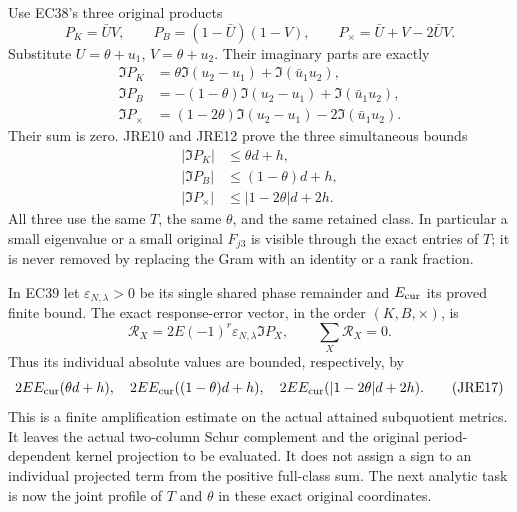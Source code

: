 Use EC38's three original products
\[
 P_K=\bar U V,\qquad P_B=(1-\bar U)(1-V),\qquad
 P_\times=\bar U+V-2\bar U V .                                \tag{JRE13}
\]
Substitute $U=\theta+u_1$, $V=\theta+u_2$. Their imaginary parts are
exactly
\[
 \begin{split}
 \Im P_K&=\theta\Im(u_2-u_1)+\Im(\bar u_1u_2),\\
 \Im P_B&=-(1-\theta)\Im(u_2-u_1)+\Im(\bar u_1u_2),\\
 \Im P_\times&=(1-2\theta)\Im(u_2-u_1)-2\Im(\bar u_1u_2).
 \end{split}                                                  \tag{JRE14}
\]
Their sum is zero. JRE10 and JRE12 prove the three simultaneous bounds
\[
 \begin{split}
 |\Im P_K|&\le\theta d+h,\\
 |\Im P_B|&\le(1-\theta)d+h,\\
 |\Im P_\times|&\le|1-2\theta|d+2h .
 \end{split}                                                  \tag{JRE15}
\]
All three use the same $T$, the same $\theta$, and the same retained
class. In particular a small eigenvalue or a small original $F_{j3}$
is visible through the exact entries of $T$; it is never removed
by replacing the Gram with an identity or a rank fraction.

In EC39 let $\varepsilon_{N,\lambda}>0$ be its single shared phase
remainder and $E_{\rm cur}$ its proved finite bound. The exact
response-error vector, in the order $(K,B,\times)$, is
\[
 \mathcal R_X=2E(-1)^r\varepsilon_{N,\lambda}\Im P_X,
 \qquad \sum_X\mathcal R_X=0 .                               \tag{JRE16}
\]
Thus its individual absolute values are bounded, respectively, by
\[
 2EE_{\rm cur}(\theta d+h),\quad
 2EE_{\rm cur}((1-\theta)d+h),\quad
 2EE_{\rm cur}(|1-2\theta|d+2h).                              \tag{JRE17}
\]
This is a finite amplification estimate on the actual attained
subquotient metrics. It leaves the actual two-column Schur complement
and the original period-dependent kernel projection to be evaluated.
It does not assign a sign to an individual projected term from the
positive full-class sum. The next analytic task is now the joint
profile of $T$ and $\theta$ in these exact original coordinates.

